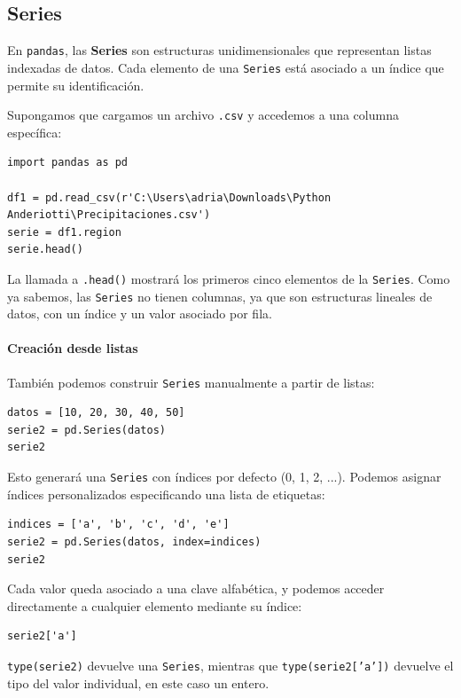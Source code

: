 \documentclass{article}
\theoremstyle{nonumberplain}
\begin{document}
\subsection*{Series}

En \texttt{pandas}, las \textbf{Series} son estructuras unidimensionales que representan listas indexadas de datos. Cada elemento de una \texttt{Series} está asociado a un índice que permite su identificación.

Supongamos que cargamos un archivo \texttt{.csv} y accedemos a una columna específica:

\begin{verbatim}
import pandas as pd

df1 = pd.read_csv(r'C:\Users\adria\Downloads\Python Anderiotti\Precipitaciones.csv')
serie = df1.region
serie.head()
\end{verbatim}

La llamada a \texttt{.head()} mostrará los primeros cinco elementos de la \texttt{Series}. Como ya sabemos, las \texttt{Series} no tienen columnas, ya que son estructuras lineales de datos, con un índice y un valor asociado por fila.

\paragraph{Creación desde listas}

También podemos construir \texttt{Series} manualmente a partir de listas:

\begin{verbatim}
datos = [10, 20, 30, 40, 50]
serie2 = pd.Series(datos)
serie2
\end{verbatim}

Esto generará una \texttt{Series} con índices por defecto (0, 1, 2, ...). Podemos asignar índices personalizados especificando una lista de etiquetas:

\begin{verbatim}
indices = ['a', 'b', 'c', 'd', 'e']
serie2 = pd.Series(datos, index=indices)
serie2
\end{verbatim}

Cada valor queda asociado a una clave alfabética, y podemos acceder directamente a cualquier elemento mediante su índice:

\begin{verbatim}
serie2['a']
\end{verbatim}

\texttt{type(serie2)} devuelve una \texttt{Series}, mientras que \texttt{type(serie2['a'])} devuelve el tipo del valor individual, en este caso un entero.
\end{document}
